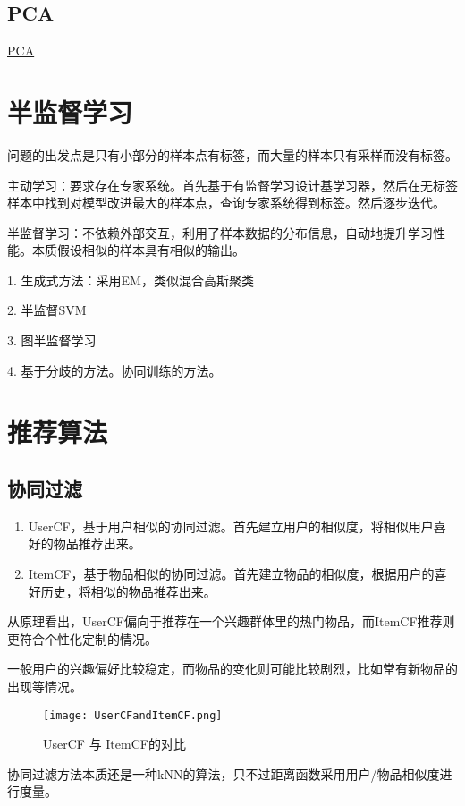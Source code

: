 \subsection{PCA}
\href{http://blog.codinglabs.org/articles/pca-tutorial.html}{PCA}


\section{半监督学习}
问题的出发点是只有小部分的样本点有标签，而大量的样本只有采样而没有标签。

主动学习：要求存在专家系统。首先基于有监督学习设计基学习器，然后在无标签样本中找到对模型改进最大的样本点，查询专家系统得到标签。然后逐步迭代。

半监督学习：不依赖外部交互，利用了样本数据的分布信息，自动地提升学习性能。本质假设相似的样本具有相似的输出。

1. 生成式方法：采用EM，类似混合高斯聚类

2. 半监督SVM

3. 图半监督学习

4. 基于分歧的方法。协同训练的方法。


\section{推荐算法}
\subsection{协同过滤}
\begin{enumerate}
\item UserCF，基于用户相似的协同过滤。首先建立用户的相似度，将相似用户喜好的物品推荐出来。
\item ItemCF，基于物品相似的协同过滤。首先建立物品的相似度，根据用户的喜好历史，将相似的物品推荐出来。
\end{enumerate}
从原理看出，UserCF偏向于推荐在一个兴趣群体里的热门物品，而ItemCF推荐则更符合个性化定制的情况。

一般用户的兴趣偏好比较稳定，而物品的变化则可能比较剧烈，比如常有新物品的出现等情况。
\begin{figure}[htbp]
	\figskip
	\centering
	\texttt{[image: UserCFandItemCF.png]}	  
	\caption{\label{fig: UserCFandItemCF} UserCF 与 ItemCF的对比}
\end{figure} 

协同过滤方法本质还是一种kNN的算法，只不过距离函数采用用户/物品相似度进行度量。



